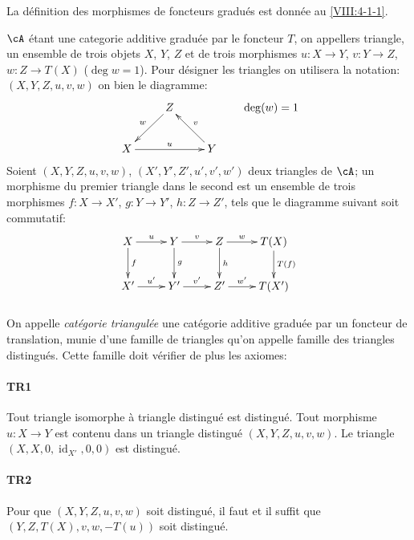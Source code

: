 La d\'efinition des morphismes de foncteurs gradu\'es est donn\'ee au 
\ref{VIII:4-1-1}. 

$\cA$ \'etant une categorie additive gradu\'ee par le foncteur $T$, on 
appellers triangle, un ensemble de trois objets $X$, $Y$, $Z$ et de trois 
morphismes $u:X\to Y$, $v:Y\to Z$, $w:Z\to T(X)$ ($\deg w=1$). Pour d\'esigner 
les triangles on utilisera la notation: $(X,Y,Z,u,v,w)$ on bien le diagramme: 
\[\xymatrix{
  & Z \ar[dl]_-w \\
  X \ar[rr]^-u 
    & & Y \ar[lu]_-v 
}\qquad \deg(w)=1
\]
Soient $(X,Y,Z,u,v,w)$, $(X',Y',Z',u',v',w')$ deux triangles de $\cA$; un 
morphisme du premier triangle dans le second est un ensemble de trois 
morphismes $f:X\to X'$, $g:Y\to Y'$, $h:Z\to Z'$, tels que le diagramme 
suivant soit commutatif: 
\[\xymatrix{
  X \ar[r]^-u \ar[d]^-f 
    & Y \ar[r]^-v \ar[d]^-g 
    & Z \ar[r]^-w \ar[d]^-h 
    & T(X) \ar[d]^-{T(f)} \\
  X' \ar[r]^-{u'} 
    & Y' \ar[r]^-{v'} 
    & Z' \ar[r]^-{w'} 
    & T(X') 
}\]





\subsubsection{}\label{VIII:1-1-1}

On appelle \emph{cat\'egorie triangul\'ee} une cat\'egorie additive gradu\'ee 
par un foncteur de translation, munie d'une famille de triangles qu'on appelle 
famille des triangles distingu\'es. Cette famille doit v\'erifier de plus les 
axiomes: 


\paragraph{TR1}
\hypertarget{VIII:TR1}{}

Tout triangle isomorphe \`a triangle distingu\'e est distingu\'e. Tout 
morphisme $u:X\to Y$ est contenu dans un triangle distingu\'e 
$(X,Y,Z,u,v,w)$. Le triangle $(X,X,0,\operatorname{id}_{X'},0,0)$ est 
distingu\'e. 


\paragraph{TR2}
\hypertarget{VIII:TR2}{}

Pour que $(X,Y,Z,u,v,w)$ soit distingu\'e, il faut et il suffit que 
$(Y,Z,T(X),v,w,-T(u))$ soit distingu\'e. 


